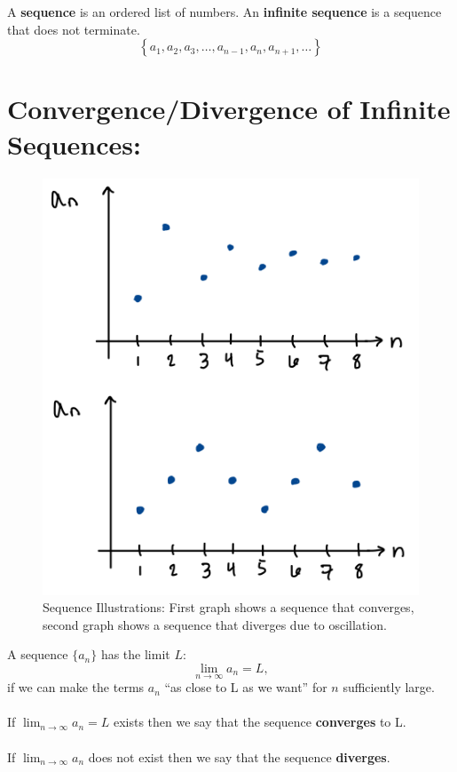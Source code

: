 A \textbf{sequence} is an ordered list of numbers. An \textbf{infinite sequence} is a sequence that does not terminate.
\[
\left\lbrace a_1, a_2, a_3, \ldots, a_{n-1}, a_n, a_{n+1}, \ldots \right\rbrace
\]


\vspace*{.1in}
\section*{Convergence/Divergence of Infinite Sequences:}


\begin{figure}[!h]
\centering
\includegraphics[width=.9\textwidth]{Ch8s1-conv-div.png}
\caption{Sequence Illustrations: First graph shows a sequence that converges, second graph shows a sequence that diverges due to oscillation.}
\end{figure}

\hspace*{.2in}
A sequence \(\lbrace a_n\rbrace\) has the limit \(L\):
\[
\lim_{n\rightarrow\infty} a_n = L,
\]
if we can make the terms \(a_n\) ``as close to L as we want'' for \(n\) sufficiently large.\\~\\
If \(\lim_{n\rightarrow\infty} a_n = L\) exists then we say that the sequence \textbf{converges} to L.\\~\\
If \(\lim_{n\rightarrow\infty} a_n \) does not exist then we say that the sequence \textbf{diverges}.\\~\\

